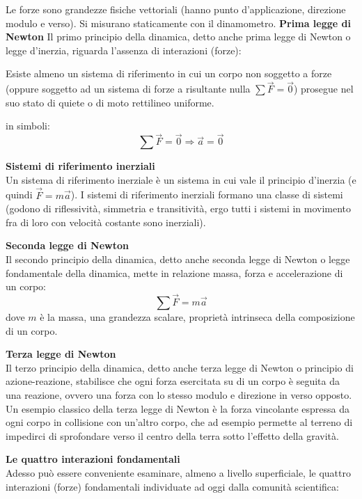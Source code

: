 \documentclass[a4paper,12pt]{article}
\begin{document}
Le forze sono grandezze fisiche vettoriali (hanno punto d'applicazione, direzione modulo e verso). Si misurano
staticamente con il dinamometro.
\newpage
\textbf{Prima legge di Newton}
Il primo principio della dinamica, detto anche prima legge di Newton o legge d'inerzia, riguarda l'assenza di interazioni
(forze):
\begin{center}
  Esiste almeno un sistema di riferimento in cui un corpo non soggetto a forze (oppure soggetto ad un sistema di
  forze a risultante nulla $\sum\vec{F} = \vec{0}$) prosegue nel suo stato di quiete o di moto rettilineo uniforme.
\end{center}
in simboli:
$$ \sum\vec{F} = \vec{0} \Rightarrow \vec{a} = \vec{0} $$
\par\smallskip
\textbf{Sistemi di riferimento inerziali} \\
Un sistema di riferimento inerziale è un sistema in cui vale il principio d'inerzia (e quindi $\vec{F} = m\vec{a}$). 
I sistemi di riferimento inerziali formano una classe di sistemi (godono di riflessività, simmetria e transitività, ergo tutti i sistemi in movimento
fra di loro con velocità costante sono inerziali).
\par\smallskip
\textbf{Seconda legge di Newton} \\
Il secondo principio della dinamica, detto anche seconda legge di Newton o legge fondamentale della dinamica, mette
in relazione massa, forza e accelerazione di un corpo:
$$ \sum \vec{F} = m \vec{a} $$
dove $m$ è la massa, una grandezza scalare, proprietà intrinseca della composizione di un corpo.
\par\smallskip
\textbf{Terza legge di Newton} \\
Il terzo principio della dinamica, detto anche terza legge di Newton o principio di azione-reazione, stabilisce
che ogni forza esercitata su di un corpo è seguita da una reazione, ovvero una forza con lo stesso modulo e direzione
in verso opposto. Un esempio classico della terza legge di Newton è la forza vincolante espressa da ogni corpo
in collisione con un'altro corpo, che ad esempio permette al terreno di impedirci di sprofondare verso il centro della terra
sotto l'effetto della gravità.
\par\smallskip
\textbf{Le quattro interazioni fondamentali} \\
Adesso può essere conveniente esaminare, almeno a livello superficiale, le quattro interazioni (forze) fondamentali
individuate ad oggi dalla comunità scientifica:
\end{document}
